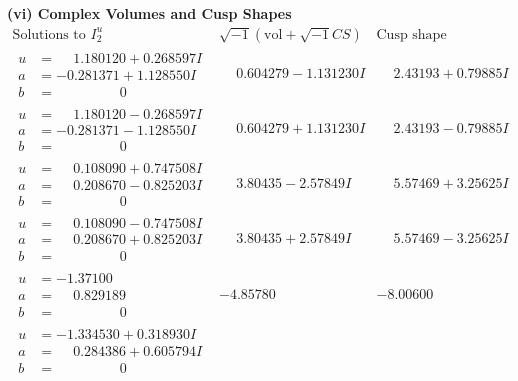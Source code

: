 \documentclass[1p]{elsarticle_modified}
\theoremstyle{definition}
\newcommand{\I}{\sqrt{-1}}
\begin{document}
\newpage\flushleft \textbf{(vi) Complex Volumes and Cusp Shapes}
$$\begin{array}{c|c|c}  
\text{Solutions to }I^u_{2}& \I (\text{vol} + \sqrt{-1}CS) & \text{Cusp shape}\\
 \hline 
\begin{aligned}
u &= \phantom{-}1.180120 + 0.268597 I \\
a &= -0.281371 + 1.128550 I \\
b &= \phantom{-0.000000 } 0\end{aligned}
 & \phantom{-}0.604279 - 1.131230 I & \phantom{-}2.43193 + 0.79885 I \\ \hline\begin{aligned}
u &= \phantom{-}1.180120 - 0.268597 I \\
a &= -0.281371 - 1.128550 I \\
b &= \phantom{-0.000000 } 0\end{aligned}
 & \phantom{-}0.604279 + 1.131230 I & \phantom{-}2.43193 - 0.79885 I \\ \hline\begin{aligned}
u &= \phantom{-}0.108090 + 0.747508 I \\
a &= \phantom{-}0.208670 - 0.825203 I \\
b &= \phantom{-0.000000 } 0\end{aligned}
 & \phantom{-}3.80435 - 2.57849 I & \phantom{-}5.57469 + 3.25625 I \\ \hline\begin{aligned}
u &= \phantom{-}0.108090 - 0.747508 I \\
a &= \phantom{-}0.208670 + 0.825203 I \\
b &= \phantom{-0.000000 } 0\end{aligned}
 & \phantom{-}3.80435 + 2.57849 I & \phantom{-}5.57469 - 3.25625 I \\ \hline\begin{aligned}
u &= -1.37100\phantom{ +0.000000I} \\
a &= \phantom{-}0.829189\phantom{ +0.000000I} \\
b &= \phantom{-0.000000 } 0\end{aligned}
 & -4.85780\phantom{ +0.000000I} & -8.00600\phantom{ +0.000000I} \\ \hline\begin{aligned}
u &= -1.334530 + 0.318930 I \\
a &= \phantom{-}0.284386 + 0.605794 I \\
b &= \phantom{-0.000000 } 0\end{aligned}

\end{array}$$
\end{document}
